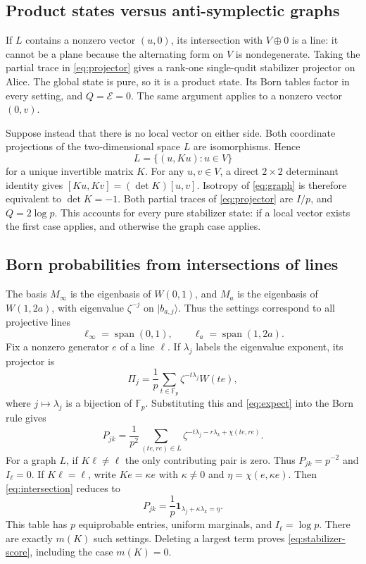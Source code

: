 \documentclass[11pt]{article}
\theoremstyle{remark}\newtheorem{remark}[theorem]{Remark}
\newcommand{\F}{\mathbb F}
\newcommand{\E}{\mathcal E}
\newcommand{\ket}[1]{\lvert#1\rangle}
\DeclareMathOperator{\spanof}{span}
\begin{document}
\subsection{Product states versus anti-symplectic graphs}
If $L$ contains a nonzero vector $(u,0)$, its intersection with $V\oplus0$ is a line: it cannot be a plane because the alternating form on $V$ is nondegenerate. Taking the partial trace in \eqref{eq:projector} gives a rank-one single-qudit stabilizer projector on Alice. The global state is pure, so it is a product state. Its Born tables factor in every setting, and $Q=\E=0$. The same argument applies to a nonzero vector $(0,v)$.

Suppose instead that there is no local vector on either side. Both coordinate projections of the two-dimensional space $L$ are isomorphisms. Hence
\begin{equation}\label{eq:graph}
 L=\{(u,Ku):u\in V\}
\end{equation}
for a unique invertible matrix $K$. For any $u,v\in V$, a direct $2\times2$ determinant identity gives $[Ku,Kv]=(\det K)[u,v]$. Isotropy of \eqref{eq:graph} is therefore equivalent to $\det K=-1$. Both partial traces of \eqref{eq:projector} are $I/p$, and $Q=2\log p$. This accounts for every pure stabilizer state: if a local vector exists the first case applies, and otherwise the graph case applies.

\subsection{Born probabilities from intersections of lines}
The basis $M_\infty$ is the eigenbasis of $W(0,1)$, and $M_a$ is the eigenbasis of $W(1,2a)$, with eigenvalue $\zeta^{-j}$ on $\ket{b_{a,j}}$. Thus the settings correspond to all projective lines
\[
 \ell_\infty=\spanof(0,1),\qquad \ell_a=\spanof(1,2a).
\]
Fix a nonzero generator $e$ of a line $\ell$. If $\lambda_j$ labels the eigenvalue exponent, its projector is
\[
 \Pi_j=\frac1p\sum_{t\in\F_p}\zeta^{-t\lambda_j}W(te),
\]
where $j\mapsto\lambda_j$ is a bijection of $\F_p$. Substituting this and \eqref{eq:expect} into the Born rule gives
\begin{equation}\label{eq:intersection}
 P_{jk}=\frac1{p^2}\sum_{(te,re)\in L}
 \zeta^{-t\lambda_j-r\lambda_k+\chi(te,re)}.
\end{equation}
For a graph $L$, if $K\ell\ne\ell$ the only contributing pair is zero. Thus $P_{jk}=p^{-2}$ and $I_\ell=0$. If $K\ell=\ell$, write $Ke=\kappa e$ with $\kappa\ne0$ and $\eta=\chi(e,\kappa e)$. Then \eqref{eq:intersection} reduces to
\[
 P_{jk}=\frac1p\mathbf1_{\lambda_j+\kappa\lambda_k=\eta}.
\]
This table has $p$ equiprobable entries, uniform marginals, and $I_\ell=\log p$. There are exactly $m(K)$ such settings. Deleting a largest term proves \eqref{eq:stabilizer-score}, including the case $m(K)=0$.
\end{document}
